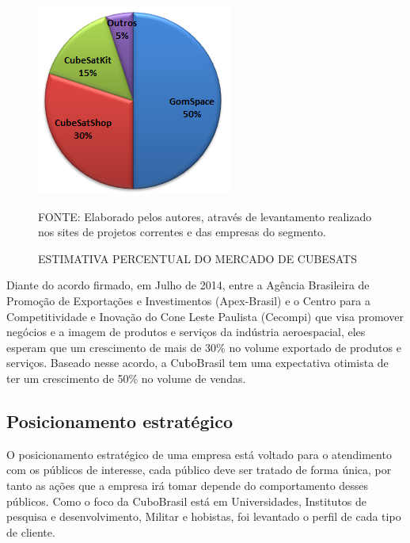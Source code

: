 \documentclass[
	12pt,				%
	openright,			%
	oneside,			%
	a4paper,			%
	english,			%
	french,				%
	spanish,			%
	brazil				%
	]{abntex2}
\begin{document}
 	\begin{figure}[th]
		\caption{ESTIMATIVA PERCENTUAL DO MERCADO DE CUBESATS}
		\centering
		\includegraphics[width=0.5\linewidth]{./figs/Figura_04}
		
		\begin{small}
			FONTE: Elaborado pelos autores, através de levantamento realizado nos sites de projetos correntes e das empresas do segmento.
		\end{small}
	\end{figure}
 	\pagebreak
 	Diante do acordo firmado, em Julho de 2014, entre a Agência Brasileira de Promoção de Exportações e Investimentos (Apex-Brasil) e o Centro para a Competitividade e Inovação do Cone Leste Paulista (Cecompi) que visa promover negócios e a imagem de produtos e serviços da indústria aeroespacial, eles esperam que um crescimento de mais de 30\% no volume exportado de produtos e serviços. Baseado nesse acordo, a CuboBrasil tem uma expectativa otimista de ter um crescimento de 50\% no volume de vendas.
	
\subsection[Posicionamento estratégico]{Posicionamento estratégico}

	O posicionamento estratégico de uma empresa está voltado para o atendimento com os públicos de interesse, cada público deve ser tratado de forma única, por tanto as ações que a empresa irá tomar depende do comportamento desses públicos. Como o foco da CuboBrasil está em Universidades, Institutos de pesquisa e desenvolvimento, Militar e hobistas, foi levantado o perfil de cada tipo de cliente.
\end{document}
